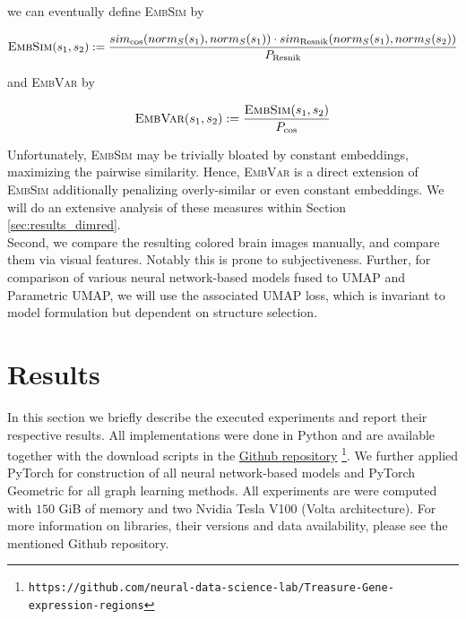 \documentclass[]{article}
\renewcommand{\cite}{\citep}
\begin{document}
we can eventually define \textsc{EmbSim} by

\begin{equation}
	\label{equ:embsim}
	\textsc{EmbSim}(s_1,s_2):= \frac{sim_\text{cos}(norm_S(s_1), norm_S(s_1)) \cdot sim_\text{Resnik}(norm_S(s_1), norm_S(s_2))}{ P_{\text{Resnik}}}
\end{equation}

and \textsc{EmbVar} by

\begin{equation}
	\label{equ:embvar}
	\textsc{EmbVar}(s_1,s_2):= \frac{\textsc{EmbSim}(s_1, s_2)}{ P_{\text{cos}} }
\end{equation}

Unfortunately, \textsc{EmbSim} may be trivially bloated by constant embeddings, maximizing the pairwise similarity. 
Hence, \textsc{EmbVar} is a direct extension of \textsc{EmbSim} additionally penalizing overly-similar or even constant embeddings. We will do an extensive analysis of these measures within Section \ref{sec:results_dimred}.\\
Second, we compare the resulting colored brain images manually, and compare them via visual features. Notably this is prone to subjectiveness.
Further, for comparison of various neural network-based models fused to UMAP and Parametric UMAP, we will use the associated UMAP loss, which is invariant to model formulation but dependent on structure selection.


\newpage
\section{Results}
\label{sec:results}
In this section we briefly describe the executed experiments and report their respective results. All implementations were done in Python and are available together with the download scripts in the \href{https://github.com/neural-data-science-lab/Treasure-Gene-expression-regions}{Github repository} \footnote{\texttt{https://github.com/neural-data-science-lab/Treasure-Gene-expression-regions}}. We further applied PyTorch \cite{Pytorch} for construction of all neural network-based models and PyTorch Geometric \cite{PytorchGeometric} for all graph learning methods. All experiments are were computed with $150$ GiB of memory and two Nvidia Tesla V100 (Volta architecture). For more information on libraries, their versions and data availability, please see the mentioned Github repository.
\end{document}
